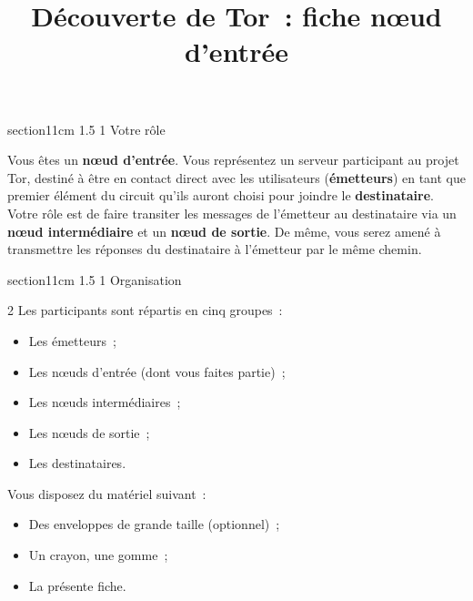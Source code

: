 \documentclass[a4paper,twoside,french]{article}
\makeatletter
\renewcommand\section{\@startsection
  {section}{1}{1cm}%
  {1.5\baselineskip}%
  {1\baselineskip}%
  {\normalfont\Large\bfseries}}%
\makeatother
\begin{document}
  
  \title{Découverte de Tor~: fiche \og n\oe ud d'entrée\fg}
  \date{}

  \maketitle
  \pagestyle{empty}
  \thispagestyle{empty}

  \section{Votre rôle}

  Vous êtes un \textbf{n\oe ud d'entrée}. Vous représentez un serveur
  participant au projet Tor, destiné à être en contact direct avec les
  utilisateurs (\textbf{émetteurs}) en tant que premier élément du
  circuit qu'ils auront choisi pour joindre le
  \textbf{destinataire}. Votre rôle est de faire transiter les messages
  de l'émetteur au destinataire via un \textbf{n\oe ud intermédiaire}
  et un \textbf{n\oe ud de sortie}. De même, vous serez amené à
  transmettre les réponses du destinataire à l'émetteur par le même
  chemin.
  
  \section{Organisation}

  \begin{multicols}{2}
    Les participants sont répartis en cinq groupes~:
    \begin{itemize}
    \item Les émetteurs~;
    \item Les n\oe uds d'entrée (dont vous faites partie)~;
    \item Les n\oe uds intermédiaires~;
    \item Les n\oe uds de sortie~;
    \item Les destinataires.
    \end{itemize}
    \vfill\columnbreak

    Vous disposez du matériel suivant~:
    \begin{itemize}
    \item Des enveloppes de grande taille (optionnel)~;
    \item Un crayon, une gomme~;
    \item La présente fiche.
    \end{itemize}
  \end{multicols}
\end{document}
